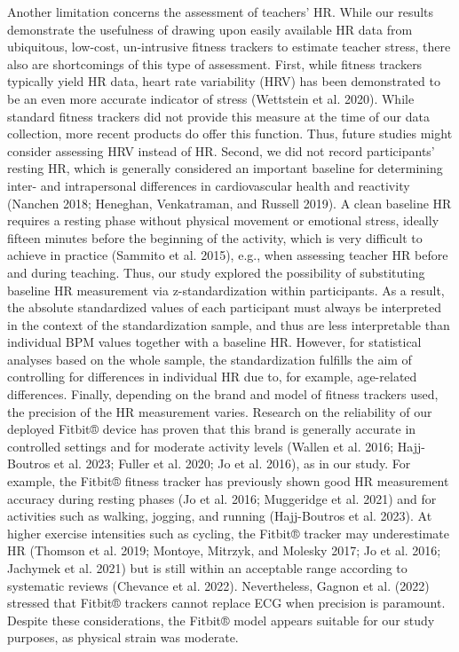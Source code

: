 \documentclass[preprint,
3p]{elsarticle} %
\begin{document}
Another limitation concerns the assessment of teachers' HR. While our
results demonstrate the usefulness of drawing upon easily available HR
data from ubiquitous, low-cost, un-intrusive fitness trackers to
estimate teacher stress, there also are shortcomings of this type of
assessment. First, while fitness trackers typically yield HR data, heart
rate variability (HRV) has been demonstrated to be an even more accurate
indicator of stress (Wettstein et al. 2020). While standard fitness
trackers did not provide this measure at the time of our data
collection, more recent products do offer this function. Thus, future
studies might consider assessing HRV instead of HR. Second, we did not
record participants' resting HR, which is generally considered an
important baseline for determining inter- and intrapersonal differences
in cardiovascular health and reactivity (Nanchen 2018; Heneghan,
Venkatraman, and Russell 2019). A clean baseline HR requires a resting
phase without physical movement or emotional stress, ideally fifteen
minutes before the beginning of the activity, which is very difficult to
achieve in practice (Sammito et al. 2015), e.g., when assessing teacher
HR before and during teaching. Thus, our study explored the possibility
of substituting baseline HR measurement via z-standardization within
participants. As a result, the absolute standardized values of each
participant must always be interpreted in the context of the
standardization sample, and thus are less interpretable than individual
BPM values together with a baseline HR. However, for statistical
analyses based on the whole sample, the standardization fulfills the aim
of controlling for differences in individual HR due to, for example,
age-related differences. Finally, depending on the brand and model of
fitness trackers used, the precision of the HR measurement varies.
Research on the reliability of our deployed Fitbit® device has proven
that this brand is generally accurate in controlled settings and for
moderate activity levels (Wallen et al. 2016; Hajj-Boutros et al. 2023;
Fuller et al. 2020; Jo et al. 2016), as in our study. For example, the
Fitbit® fitness tracker has previously shown good HR measurement
accuracy during resting phases (Jo et al. 2016; Muggeridge et al. 2021)
and for activities such as walking, jogging, and running (Hajj-Boutros
et al. 2023). At higher exercise intensities such as cycling, the
Fitbit® tracker may underestimate HR (Thomson et al. 2019; Montoye,
Mitrzyk, and Molesky 2017; Jo et al. 2016; Jachymek et al. 2021) but is
still within an acceptable range according to systematic reviews
(Chevance et al. 2022). Nevertheless, Gagnon et al. (2022) stressed that
Fitbit® trackers cannot replace ECG when precision is paramount. Despite
these considerations, the Fitbit® model appears suitable for our study
purposes, as physical strain was moderate.
\end{document}
